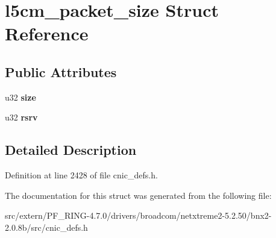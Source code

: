 \hypertarget{structl5cm__packet__size}{
\section{l5cm\_\-packet\_\-size Struct Reference}
\label{structl5cm__packet__size}
}
\subsection*{Public Attributes}
\begin{DoxyCompactItemize}
\item 
\hypertarget{structl5cm__packet__size_ad7aaf8bb042abffa9ebb441732acb599}{
u32 {\bfseries size}}
\label{structl5cm__packet__size_ad7aaf8bb042abffa9ebb441732acb599}

\item 
\hypertarget{structl5cm__packet__size_ab18c4e05eceb6a60e850f498cc95f5a6}{
u32 {\bfseries rsrv}}
\label{structl5cm__packet__size_ab18c4e05eceb6a60e850f498cc95f5a6}

\end{DoxyCompactItemize}


\subsection{Detailed Description}


Definition at line 2428 of file cnic\_\-defs.h.



The documentation for this struct was generated from the following file:\begin{DoxyCompactItemize}
\item 
src/extern/PF\_\-RING-\/4.7.0/drivers/broadcom/netxtreme2-\/5.2.50/bnx2-\/2.0.8b/src/cnic\_\-defs.h\end{DoxyCompactItemize}
